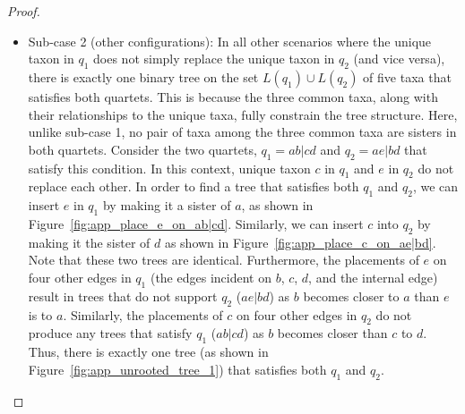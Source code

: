 \documentclass[10pt,a4paper]{article}
\begin{document}
\begin{appendices}
\begin{proof}
\begin{itemize}
\begin{itemize}
Let us now consider the two additional cases where taxon $e$ is placed on the other two branches of the quartet $ab|cd$. First, if taxon $e$ is placed as the sister taxon to $a$, one of the resulting induced quartets is $ae|bc$, which does not satisfy $ab|ce$ as $e$  is now the sister to $a$. Similarly, if $e$ is placed as the sister to $b$, the quartet $ac|be$ is formed, which also is not consistent with $ab|ce$. Thus, there are exactly three trees on $\{a,b,c,d,e\}$ that satisfy both $q_1$ and $q_2$.
\begin{figure}[h]
    \centering
    \begin{subfigure}{0.45\textwidth}
        \centering
        \caption{Placements of $e$ on the quartet $ab|cd$}
        \label{fig:place_e}
    \end{subfigure}
    \hfill %
    \begin{subfigure}{0.45\textwidth}
        \centering
        \caption{Placements of $d$ on the quartet $ab|ce$}
        \label{fig:place_d}
    \end{subfigure}
    \caption{Placements for $e$ and $d$ on $q_1$ and $q_2$ respectively.}
    \label{fig:app_place_both}
\end{figure}

\item Sub-case 2 (other configurations): In all other scenarios where the unique taxon in $q_1$ does not simply replace the unique taxon in $q_2$ (and vice versa), there is exactly one binary tree on the set $L(q_1)\cup L(q_2)$ of five taxa that satisfies both quartets. This is because the three common taxa, along with their relationships to the unique taxa, fully constrain the tree structure. Here, unlike sub-case 1, no pair of taxa among the three common taxa are sisters in both quartets. Consider the two quartets, $q_1 = ab|cd$ and $q_2 =  ae|bd$ %
that satisfy this condition. In this context, unique taxon $c$ in $q_1$ and $e$ in $q_2$ do not replace each other. In order to find a tree that satisfies both $q_1$ and $q_2$, we can insert $e$ in $q_1$ by making it a sister of $a$, as shown in Figure~\ref{fig:app_place_e_on_ab|cd}. Similarly, we can insert $c$ into $q_2$ by making it the sister of $d$ as shown in Figure~\ref{fig:app_place_c_on_ae|bd}. Note that these two trees are identical. Furthermore, the placements of $e$ on four other edges in $q_1$ (the edges incident on $b$, $c$, $d$, and the internal edge) result in trees that do not support $q_2$ ($ae|bd$) as $b$ becomes closer to $a$ than $e$ is to $a$. Similarly, the placements of $c$ on four other edges in $q_2$ do not produce any trees that satisfy $q_1$ ($ab|cd$) as  $b$ becomes closer than $c$ to $d$. Thus, there is exactly one tree (as shown in Figure~\ref{fig:app_unrooted_tree_1}) that satisfies both $q_1$ and $q_2$.


\end{itemize}
\end{itemize}
\end{proof}
\end{appendices}
\end{document}
